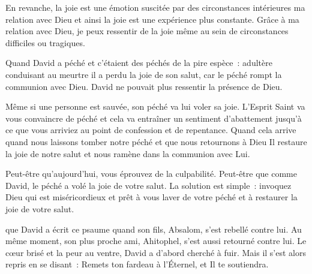 En revanche, la joie est une émotion suscitée par des circonstances
 intérieures \ocadr ma relation avec Dieu \fcadr{} et ainsi la joie
 est une expérience plus constante.
 Grâce à ma relation avec Dieu, je peux ressentir de la joie
 même au sein de circonstances difficiles ou tragiques. 

Quand David a péché \ocadr et c'étaient des péchés de la pire espèce~:
 adultère conduisant au meurtre \fcadr{} il a perdu la joie de son salut,
 car le péché rompt la communion avec Dieu.
 David ne pouvait plus ressentir la présence de Dieu. 


Même si une personne est sauvée, son péché va lui voler sa joie.
 L'Esprit Saint va vous convaincre de péché et cela va entraîner
 un sentiment d'abattement jusqu'à ce que vous arriviez au point de confession
 et de repentance.
 Quand cela arrive \ocadr quand nous laissons tomber notre péché
 et que nous retournons à Dieu \fcadr Il restaure la joie de notre salut
 et nous ramène dans la communion avec Lui. 

Peut-être qu'aujourd'hui, vous éprouvez de la culpabilité.
 Peut-être que comme David, le péché a volé la joie de votre salut.
 La solution est simple~: invoquez Dieu qui est miséricordieux
 et prêt à vous laver de votre péché et à restaurer la joie de votre salut.

\dvrule






 que David a écrit ce psaume quand son fils,
 Absalom, s'est rebellé contre lui.
 Au même moment, son plus proche ami, Ahitophel,
 s'est aussi retourné contre lui. Le cœur brisé et la peur au ventre,
 David a d'abord cherché à fuir.
 Mais il s'est alors repris en se disant~:
 \og Remets ton fardeau à l'Éternel, et Il te soutiendra. \fg{}


